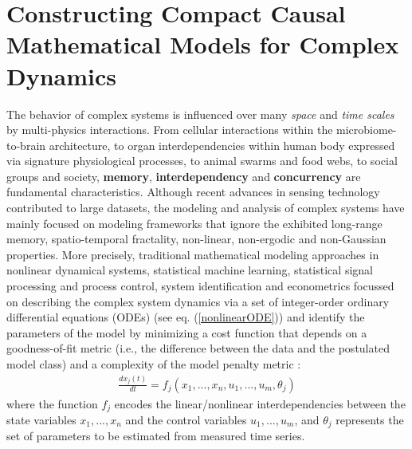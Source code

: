 \chapter{Constructing Compact Causal Mathematical Models for Complex Dynamics}
\label{cha:ch2}
The behavior of complex systems is influenced over many \textit{space} and \textit{time scales} by multi-physics interactions. From cellular interactions within the microbiome-to-brain architecture, to organ interdependencies within human body expressed via signature physiological processes, to animal swarms and food webs, to social groups and society, \textbf{memory}, \textbf{interdependency} and \textbf{concurrency} are fundamental characteristics. Although recent advances in sensing technology contributed to large datasets, the modeling and analysis of complex systems have mainly focused on modeling frameworks that ignore the exhibited long-range memory, spatio-temporal fractality, non-linear, non-ergodic and non-Gaussian properties. More precisely, traditional mathematical modeling approaches in nonlinear dynamical systems, statistical machine learning, statistical signal processing and process control, system identification and econometrics focussed on describing the complex system dynamics via a set of integer-order ordinary differential equations (ODEs) (see eq. (\ref{nonlinearODE})) and identify the parameters of the model by minimizing a cost function that depends on a goodness-of-fit metric (i.e., the difference between the data and the postulated model class) and a complexity of the model penalty metric \cite{Ljung2010}:
\begin{eqnarray}
\label{nonlinearODE}
&\frac{\displaystyle dx_{j}(t)}{dt} = f_{j}(x_{1},...,x_{n},u_{1},...,u_{m},\theta_{j})&
\end{eqnarray} 
where the function $f_{j}$ encodes the linear/nonlinear interdependencies between the state variables $x_{1},...,x_{n}$ and the control variables $u_{1},...,u_{m}$, and $\theta_{j}$ represents the set of parameters to be estimated from measured time series. 

